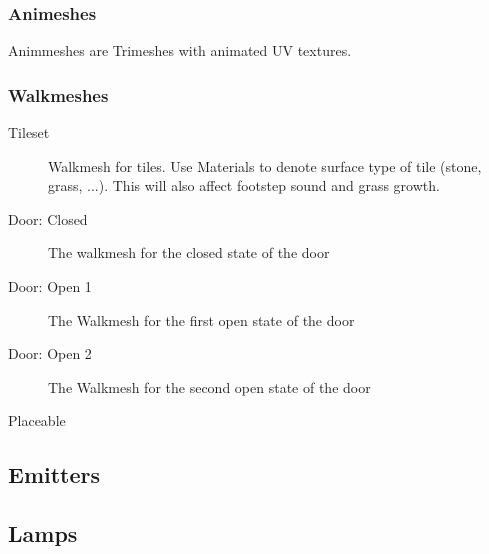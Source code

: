\subsubsection{Animeshes}
Animmeshes are Trimeshes with animated UV textures.

\subsubsection{Walkmeshes}
\begin{description}
    \item[Tileset] Walkmesh for tiles. Use Materials to denote surface type of
                   tile (stone, grass, ...). This will also affect footstep
                   sound and grass growth.
    \item[Door: Closed] The walkmesh for the closed state of the door
    \item[Door: Open 1] The Walkmesh for the first open state of the door
    \item[Door: Open 2] The Walkmesh for the second open state of the door
    \item[Placeable]
\end{description}

\subsection{Emitters}

\subsection{Lamps}
